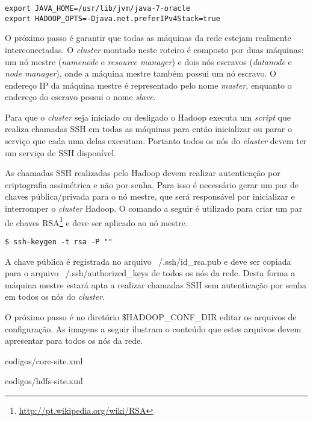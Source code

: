 \begin{apendicesenv}
\begin{lstlisting}[style=abnt,frame=single]
export JAVA_HOME=/usr/lib/jvm/java-7-oracle
export HADOOP_OPTS=-Djava.net.preferIPv4Stack=true 
\end{lstlisting}


O próximo passo é garantir que todas as máquinas da rede estejam realmente interconectadas. O \textit{cluster} montado neste roteiro é composto por duas máquinas: um nó mestre (\textit{namenode} e \textit{resource manager}) e dois nós escravos (\textit{datanode} e \textit{node manager}), onde a máquina mestre também possui um nó escravo. O endereço IP da máquina mestre é representado pelo nome \textit{master}, enquanto o endereço do escravo possui o nome \textit{slave}.

Para que o \textit{cluster} seja iniciado ou desligado o Hadoop executa um \textit{script} que realiza chamadas SSH em todas as máquinas para então inicializar ou parar o serviço que cada uma delas executam. Portanto todos os nós do \textit{cluster} devem ter um serviço de SSH disponível.

As chamadas SSH realizadas pelo Hadoop devem realizar autenticação por criptografia assimétrica e não por senha. Para isso é necessário gerar um par de chaves pública/privada para o nó mestre, que será responsável por inicializar e interromper o \textit{cluster} Hadoop. O comando a seguir é utilizado para criar um par de chaves RSA\footnote{\url{http://pt.wikipedia.org/wiki/RSA}} e deve ser aplicado ao nó mestre.

\begin{lstlisting}[style=abnt,frame=single]
$ ssh-keygen -t rsa -P ""
\end{lstlisting}

A chave pública é registrada no arquivo ~/.ssh/id\_rsa.pub e deve ser copiada para o arquivo ~/.ssh/authorized\_keys de todos os nós da rede. Desta forma a máquina mestre estará apta a realizar chamadas SSH sem autenticação por senha em todos os nós do \textit{cluster}.

O próximo passo é no diretório \$HADOOP\_CONF\_DIR editar os arquivos de configuração. As imagens a seguir ilustram o conteúdo que estes arquivos devem apresentar para todos os nós da rede.


		{codigos/core-site.xml}

\newpage

		{codigos/hdfs-site.xml}


\end{apendicesenv}

